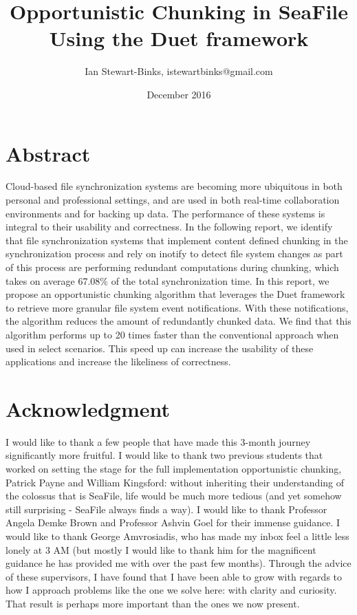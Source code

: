 \documentclass[table]{article}
\title{Opportunistic Chunking in SeaFile Using the Duet framework}
\author{Ian Stewart-Binks, istewartbinks@gmail.com}
\date{December 2016}
\begin{document}
\maketitle

\newpage

\begin{multicols}{2}

\section{Abstract}


Cloud-based file synchronization systems are becoming more ubiquitous in both personal and professional settings, and are used in both real-time collaboration environments and for backing up data. The performance of these systems is integral to their usability and correctness. In the following report, we identify that file synchronization systems that implement content defined chunking in the synchronization process and rely on inotify to detect file system changes as part of this process are performing redundant computations during chunking, which takes on average 67.08\% of the total synchronization time. In this report, we propose an opportunistic chunking algorithm that leverages the Duet framework to retrieve more granular file system event notifications. With these notifications, the algorithm reduces the amount of redundantly chunked data. We find that this algorithm performs up to 20 times faster than the conventional approach when used in select scenarios. This speed up can increase the usability of these applications and increase the likeliness of correctness.

\section{Acknowledgment}

I would like to thank a few people that have made this 3-month journey significantly more fruitful. I would like to thank two previous students that worked on setting the stage for the full implementation opportunistic chunking, Patrick Payne and William Kingsford: without inheriting their understanding of the colossus that is SeaFile, life would be much more tedious (and yet somehow still surprising - SeaFile always finds a way). I would like to thank Professor Angela Demke Brown and Professor Ashvin Goel for their immense guidance. I would like to thank George Amvrosiadis, who has made my inbox feel a little less lonely at 3 AM (but mostly I would like to thank him for the magnificent guidance he has provided me with over the past few months). Through the advice of these supervisors, I have found that I have been able to grow with regards to how I approach problems like the one we solve here: with clarity and curiosity. That result is perhaps more important than the ones we now present.


\end{multicols}
\end{document}

